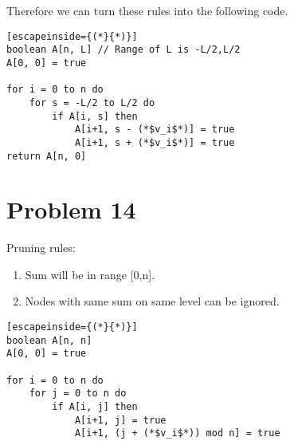 \documentclass{article}
\providecommand{\prob}[1]{\section*{Problem #1}}
\begin{document}
    Therefore we can turn these rules into the following code.
    \begin{lstlisting}[escapeinside={(*}{*)}]
boolean A[n, L] // Range of L is -L/2,L/2
A[0, 0] = true

for i = 0 to n do
    for s = -L/2 to L/2 do
        if A[i, s] then
            A[i+1, s - (*$v_i$*)] = true
            A[i+1, s + (*$v_i$*)] = true
return A[n, 0]
    \end{lstlisting}
    

    \prob{14}
    Pruning rules:
    \begin{enumerate}
        \item Sum will be in range [0,n].
        \item Nodes with same sum on same level can be ignored.
    \end{enumerate}

    \begin{lstlisting}[escapeinside={(*}{*)}]
boolean A[n, n]
A[0, 0] = true

for i = 0 to n do
    for j = 0 to n do
        if A[i, j] then
            A[i+1, j] = true
            A[i+1, (j + (*$v_i$*)) mod n] = true

    \end{lstlisting}
\end{document}
